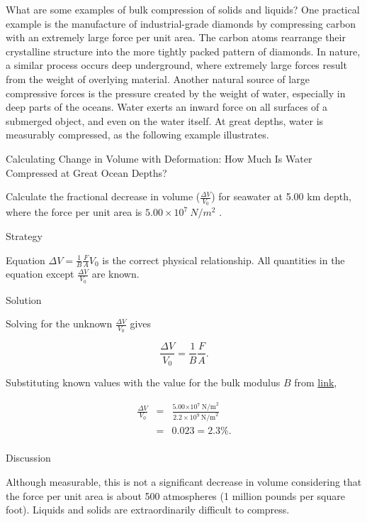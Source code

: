 \documentclass[
]{book}
\begin{document}
What are some examples of bulk compression of solids and liquids? One
practical example is the manufacture of industrial-grade diamonds by
compressing carbon with an extremely large force per unit area. The
carbon atoms rearrange their crystalline structure into the more tightly
packed pattern of diamonds. In nature, a similar process occurs deep
underground, where extremely large forces result from the weight of
overlying material. Another natural source of large compressive forces
is the pressure created by the weight of water, especially in deep parts
of the oceans. Water exerts an inward force on all surfaces of a
submerged object, and even on the water itself. At great depths, water
is measurably compressed, as the following example illustrates.

\hypertarget{fs-id1165298751418}{}
Calculating Change in Volume with Deformation: How Much Is Water
Compressed at Great Ocean Depths?

Calculate the fractional decrease in volume (\(\frac{\Delta V}{V_{0}}{}\))
for seawater at 5.00 km depth, where the force per unit area is
\({5\text{.}{\text{00} \times \text{10}^{7}}\ {N/m^{2}}}{}\) .

{Strategy}

Equation \({{\Delta V = \frac{1}{B}}\frac{F}{A}V_{0}}{}\) is the correct
physical relationship. All quantities in the equation except
\(\frac{\Delta V}{V_{0}}\) are known.

{Solution}

Solving for the unknown \(\frac{\Delta V}{V_{0}}\) gives

\leavevmode{}%
\[{{{\frac{\Delta V}{V_{0}} = \frac{1}{B}}\frac{F}{A}}.}{}\]

Substituting known values with the value for the bulk modulus \(B\) from
\protect\hyperlink{import-auto-id1165298671576}{link},

\leavevmode{}%
\[\begin{array}{lll}
\frac{\Delta V}{V_{0}} & = & \frac{5.00{\times \text{10}^{7}}\ \text{N/m}^{2}}{2\text{.}{2 \times \text{10}^{9}}\ \text{N/m}^{2}} \\
 & = & {0.023 = 2.3\%.} \\
\end{array}{}\]

{Discussion}

Although measurable, this is not a significant decrease in volume
considering that the force per unit area is about 500 atmospheres (1
million pounds per square foot). Liquids and solids are extraordinarily
difficult to compress.
\end{document}
